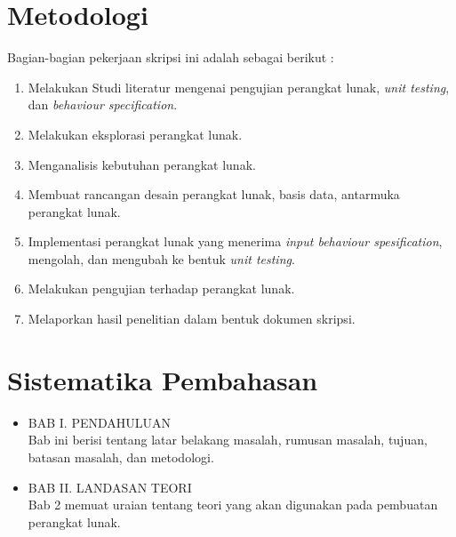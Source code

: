 \section{Metodologi}
\label{sec:metlit}
Bagian-bagian pekerjaan skripsi ini adalah sebagai berikut :
\begin{enumerate}
\item Melakukan Studi literatur mengenai pengujian perangkat lunak, \textit{unit testing}, dan \textit{behaviour specification}.
\item Melakukan eksplorasi perangkat lunak.
\item Menganalisis kebutuhan perangkat lunak.
\item Membuat rancangan desain perangkat lunak, basis data, antarmuka perangkat lunak.
\item Implementasi perangkat lunak yang menerima \textit{input behaviour spesification}, mengolah, dan mengubah ke bentuk \textit{unit testing}.
\item Melakukan pengujian terhadap perangkat lunak.
\item Melaporkan hasil penelitian dalam bentuk dokumen skripsi.
\end{enumerate}

\section{Sistematika Pembahasan}
\label{sec:sispem}
\begin{itemize}

\item BAB I. PENDAHULUAN\\
Bab ini berisi tentang latar belakang masalah, rumusan
masalah, tujuan, batasan masalah, dan metodologi.
\item BAB II. LANDASAN TEORI\\
Bab 2 memuat uraian tentang teori yang akan digunakan pada pembuatan perangkat lunak.
\end{itemize}